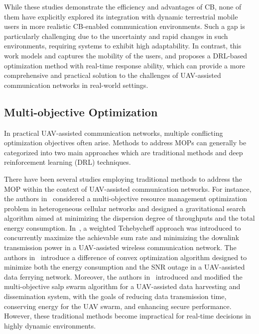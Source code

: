 \par While these studies demonstrate the efficiency and advantages of CB, none of them have explicitly explored its integration with dynamic terrestrial mobile users in more realistic CB-enabled communication environments. Such a gap is particularly challenging due to the uncertainty and rapid changes in such environments, requiring systems to exhibit high adaptability. In contrast, this work models and captures the mobility of the users, and proposes a DRL-based optimization method with real-time response ability, which can provide a more comprehensive and practical solution to the challenges of UAV-assisted communication networks in real-world settings.


\subsection{Multi-objective Optimization}
\label{Multi-objective Optimization}

\par In practical UAV-assisted communication networks, multiple conflicting optimization objectives often arise. Methods to address MOPs can generally be categorized into two main approaches which are traditional methods and deep reinforcement learning (DRL) techniques.

\par There have been several studies employing traditional methods to address the MOP within the context of UAV-assisted communication networks. For instance, the authors in~\cite{Liu2021resource} considered a multi-objective resource management optimization problem in heterogeneous cellular networks and designed a gravitational search algorithm aimed at minimizing the dispersion degree of throughputs and the total energy consumption. In~\cite{Muhammad2021performance}, a weighted Tchebycheff approach was introduced to concurrently maximize the achievable sum rate and minimizing the downlink transmission power in a UAV-assisted wireless communication network. The authors in~\cite{Shafique2020end-to-end} introduce a difference of convex optimization algorithm designed to minimize both the energy consumption and the SNR outage in a UAV-assisted data ferrying network. Moreover, the authors in~\cite{Li2023multi-objective} introduced and modified the multi-objective salp swarm algorithm for a UAV-assisted data harvesting and dissemination system, with the goals of reducing data transmission time, conserving energy for the UAV swarm, and enhancing secure performance. However, these traditional methods become impractical for real-time decisions in highly dynamic environments.

